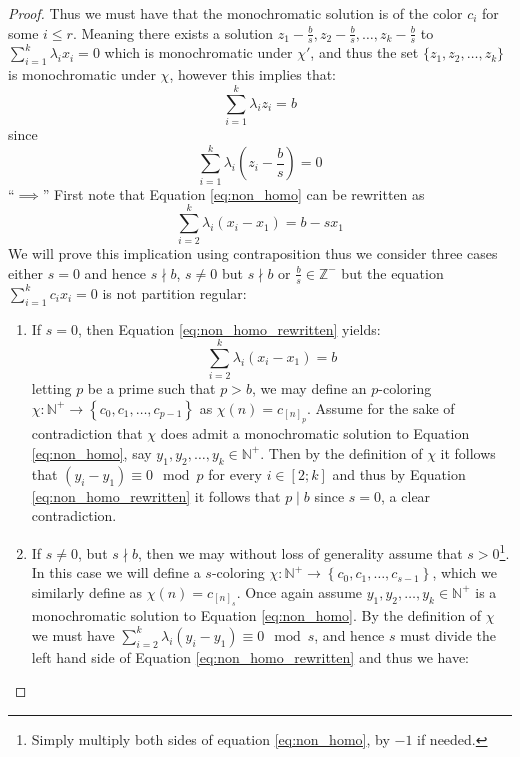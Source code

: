 \begin{proof}
	Thus we must have that the monochromatic solution is of the color $c_{i}$ for some $i \leq r$.
	Meaning there exists a solution $z_1 - \frac{b}{s}, z_2 - \frac{b}{s}, \ldots, z_k - \frac{b}{s}$ to $\sum_{i = 1}^k \lambda_ix_{i} = 0$ which is monochromatic under $\chi'$, and thus the set $\{z_1, z_2, \ldots, z_k\}$ is monochromatic under $\chi$, however this implies that:
	\begin{equation*}
		\sum_{i = 1}^k \lambda_i z_i = b
	\end{equation*}
	since
	\begin{equation*}
		\sum_{i = 1}^k\lambda_i \left(z_i - \frac{b}{s}\right) = 0
	\end{equation*}
	``$\implies$'' First note that Equation \eqref{eq:non_homo} can be rewritten as
	\begin{equation}\label{eq:non_homo_rewritten}
		\sum_{i = 2}^k \lambda_i (x_i - x_1) = b - sx_{1}
	\end{equation}
	We will prove this implication using contraposition thus we consider three cases either $s = 0$ and hence $s \nmid b$, $s \neq 0$ but $s \nmid b$ or $\frac{b}{s} \in \mathbb{Z}^{-}$ but the equation $\sum_{i = 1}^{k} c_{i} x_{i} = 0$ is not partition regular:
	\begin{enumerate}
		\item If $s = 0$, then Equation \eqref{eq:non_homo_rewritten} yields:
		      \begin{equation}\label{eq:non_homo_rewritten_s0}
			      \sum_{i = 2}^k \lambda_i (x_i  - x_1) = b
		      \end{equation}
		      letting $p$ be a prime such that $p > b$, we may define an $p$-coloring $\chi: \mathbb{N}^{+} \to \left\{c_0, c_1, \ldots, c_{p - 1}\right\}$ as $\chi(n) = c_{[n]_{p}}$. Assume for the sake of contradiction that $\chi$ does admit a monochromatic solution to Equation \eqref{eq:non_homo}, say $y_1, y_2, \ldots, y_k \in \mathbb{N}^{+}$. Then by the definition of $\chi$ it follows that $(y_{i} - y_{1}) \equiv 0 \mod p$ for every $i \in [2; k]$ and thus by Equation \eqref{eq:non_homo_rewritten} it follows that $p \mid b$ since $s = 0$, a clear contradiction.
		\item If $s \neq 0$, but $s \nmid b$, then we may without loss of generality assume that $s > 0$\footnote{Simply multiply both sides of equation \eqref{eq:non_homo}, by $-1$ if needed.}. In this case we will define a $s$-coloring $\chi: \mathbb{N}^{+} \to \left\{c_0, c_1, \ldots, c_{s - 1}\right\}$, which we similarly define as $\chi(n) = c_{[n]_{s}}$. Once again assume $y_1, y_2, \ldots, y_k \in \mathbb{N}^{+}$ is a monochromatic solution to Equation \eqref{eq:non_homo}. By the definition of $\chi$ we must have $\sum_{i = 2}^{k} \lambda_{i} (y_{i} - y_{1}) \equiv 0 \mod s$, and hence $s$ must divide the left hand side of Equation \eqref{eq:non_homo_rewritten} and thus we have:

\end{enumerate}
\end{proof}
